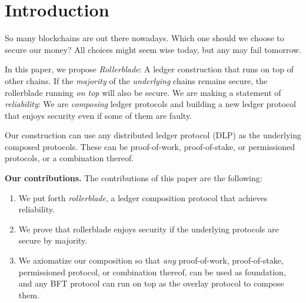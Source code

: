 \section{Introduction}
So many blockchains are out there nowadays. Which one should we choose to secure
our money? All choices might seem wise today, but any may fail tomorrow.

In this paper, we propose \emph{Rollerblade}: A ledger construction
that runs on top of other chains. If the
\emph{majority} of the \emph{underlying} chains remains secure, the rollerblade running
\emph{on top} will also be secure.
We are making a statement of \emph{reliability}: We are \emph{composing}
ledger protocols and building a new ledger protocol that enjoys
security even if some of them are faulty.

Our construction can use any distributed ledger protocol (DLP) as the underlying
composed protocols. These can be proof-of-work, proof-of-stake, or permissioned
protocols, or a combination thereof.

\noindent
\textbf{Our contributions.} The contributions of this paper are the following:

\begin{enumerate}
  \item We put forth \emph{rollerblade}, a ledger composition protocol that achieves
        reliability.
  \item We prove that rollerblade enjoys security if the underlying protocols
        are secure by majority.
  \item We axiomatize our composition so that \emph{any} proof-of-work, proof-of-stake,
        permissioned protocol, or combination thereof, can be used as foundation,
        and any BFT protocol can run on top as the overlay protocol to compose them.
\end{enumerate}

